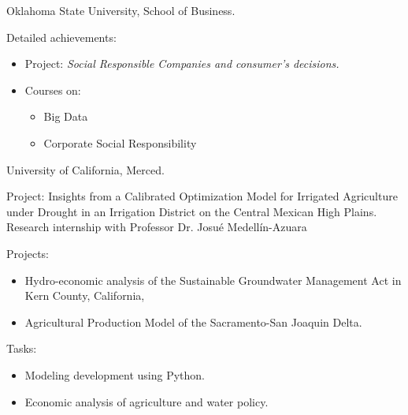 \documentclass[a4paper,12pt]{memoir} %
\begin{document}

 {Oklahoma State University, School of Business.}

Detailed achievements:
\begin{itemize}
	\item Project: \textit{Social Responsible Companies and consumer's decisions.}
	\item Courses on: 
	\begin{itemize}
		\item Big Data
		\item Corporate Social Responsibility
	\end{itemize}
\end{itemize}

\vspace{0.2 cm}

 {University of California, Merced.}

Project: Insights from a Calibrated Optimization Model for Irrigated Agriculture under Drought in an Irrigation District on the Central Mexican High Plains. Research internship with Professor Dr. Josué Medellín-Azuara\\



Projects:
	\begin{itemize}
		\item Hydro-economic analysis of the Sustainable Groundwater Management Act in Kern County, California, 
		\item Agricultural Production Model of the Sacramento-San Joaquin Delta.
	\end{itemize}

Tasks: 


\begin{itemize}
	\item Modeling development using Python.
	\item Economic analysis of agriculture and water policy.
\end{itemize}


\end{document}
